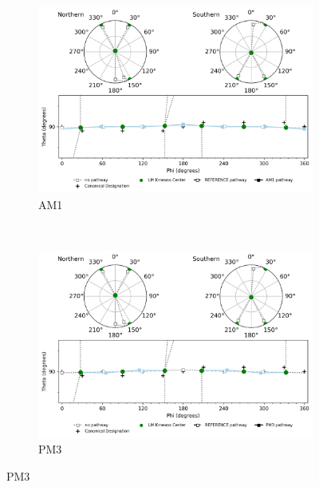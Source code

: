 \documentclass{article}
\begin{document}
\begin{figure}[H]\ContinuedFloat
	\centering
	\begin{subfigure}[b]{0.48\textwidth}
		\includegraphics[width=1\textwidth,keepaspectratio]
		{figures/oxane/all_groups/z_dataset-oxane-TS--all_groups_comp-AM1.png}
		\caption{AM1}
	\end{subfigure}
	~
	\begin{subfigure}[b]{0.48\textwidth}
		\includegraphics[width=1\textwidth,keepaspectratio]
		{figures/oxane/all_groups/z_dataset-oxane-TS--all_groups_comp-PM3.png}
		\caption{PM3}
	\end{subfigure}
\end{figure}
\end{document}
